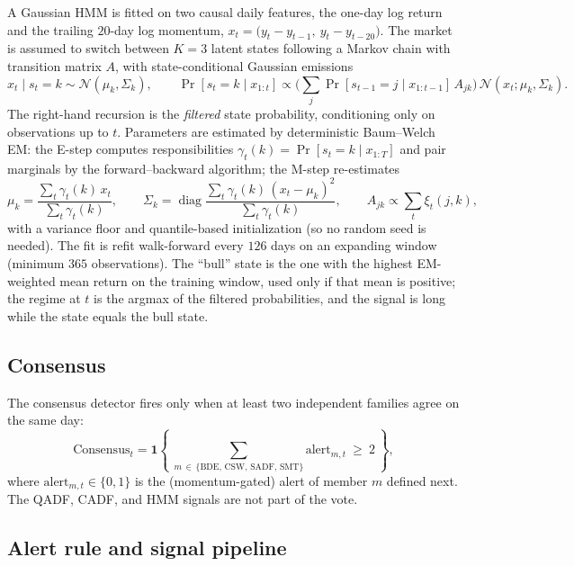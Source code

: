 \documentclass[11pt]{article}
\begin{document}
A Gaussian HMM is fitted on two causal daily features, the one-day log return and the trailing $20$-day log momentum, $x_t=\big(y_t-y_{t-1},\ y_t-y_{t-20}\big)$. The market is assumed to switch between $K=3$ latent states following a Markov chain with transition matrix $A$, with state-conditional Gaussian emissions
\[
    x_t \mid s_t = k \sim \mathcal{N}(\mu_k, \Sigma_k),
    \qquad
    \Pr[s_t = k \mid x_{1:t}] \propto
    \Big( \textstyle\sum_j \Pr[s_{t-1}=j \mid x_{1:t-1}]\, A_{jk} \Big)\, \mathcal{N}(x_t; \mu_k, \Sigma_k).
\]
The right-hand recursion is the \emph{filtered} state probability, conditioning only on observations up to $t$. Parameters are estimated by deterministic Baum--Welch EM: the E-step computes responsibilities $\gamma_{t}(k)=\Pr[s_t=k\mid x_{1:T}]$ and pair marginals by the forward--backward algorithm; the M-step re-estimates
\[
    \mu_k = \frac{\sum_t \gamma_t(k)\,x_t}{\sum_t \gamma_t(k)},
    \qquad
    \Sigma_k = \operatorname{diag}\!\frac{\sum_t \gamma_t(k)\,(x_t-\mu_k)^2}{\sum_t \gamma_t(k)},
    \qquad
    A_{jk} \propto \sum_t \xi_t(j,k),
\]
with a variance floor and quantile-based initialization (so no random seed is needed). The fit is refit walk-forward every $126$ days on an expanding window (minimum $365$ observations). The ``bull'' state is the one with the highest EM-weighted mean return on the training window, used only if that mean is positive; the regime at $t$ is the argmax of the filtered probabilities, and the signal is long while the state equals the bull state.

\subsection{Consensus}

The consensus detector fires only when at least two independent families agree on the same day:
\[
    \mathrm{Consensus}_t = \mathbf{1}\!\left\{\ \sum_{m\,\in\,\{\mathrm{BDE},\,\mathrm{CSW},\,\mathrm{SADF},\,\mathrm{SMT}\}} \mathrm{alert}_{m,t}\ \ge\ 2\ \right\},
\]
where $\mathrm{alert}_{m,t}\in\{0,1\}$ is the (momentum-gated) alert of member $m$ defined next. The QADF, CADF, and HMM signals are not part of the vote.

\subsection{Alert rule and signal pipeline}
\end{document}

